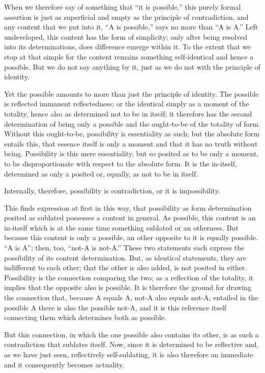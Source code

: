 When we therefore say of something that “it is possible,”
this purely formal assertion is just as superficial and empty
as the principle of contradiction,
and any content that we put into it,
“A is possible,” says no more than “A is A.”
Left undeveloped, this content has the form of simplicity;
only after being resolved into its determinations,
does difference emerge within it.
To the extent that we stop at that simple for
the content remains something self-identical
and hence a possible.
But we do not say anything by it,
just as we do not with the principle of identity.

Yet the possible amounts to more than just the principle of identity.
The possible is reflected immanent reflectedness;
or the identical simply as a moment of the totality,
hence also as determined not to be in itself;
it therefore has the second determination of being only a possible
and the ought-to-be of the totality of form.
Without this ought-to-be, possibility is essentiality as such;
but the absolute form entails this,
that essence itself is only a moment
and that it has no truth without being.
Possibility is this mere essentiality,
but so posited as to be only a moment,
to be disproportionate with respect to the absolute form.
It is the in-itself, determined as only a posited
or, equally, as not to be in itself.

Internally, therefore, possibility is contradiction,
or it is impossibility.

This finds expression at first in this way,
that possibility as form determination posited as sublated
possesses a content in general.
As possible, this content is an in-itself
which is at the same time something sublated
or an otherness.
But because this content is only a possible,
an other opposite to it is equally possible.
“A is A”; then, too, “not-A is not-A.”
These two statements each express
the possibility of its content determination.
But, as identical statements, they are indifferent to each other;
that the other is also added, is not posited in either.
Possibility is the connection comparing the two;
as a reflection of the totality,
it implies that the opposite also is possible.
It is therefore the ground for drawing the connection that,
because A equals A, not-A also equals not-A;
entailed in the possible A there is also the possible not-A,
and it is this reference itself connecting them
which determines both as possible.

But this connection, in which the one possible also contains its other,
is as such a contradiction that sublates itself.
Now, since it is determined to be reflective
and, as we have just seen, reflectively self-sublating,
it is also therefore an immediate
and it consequently becomes actuality.

